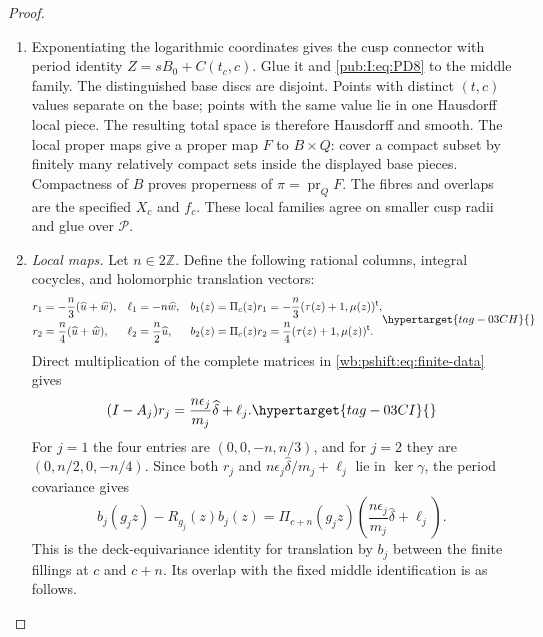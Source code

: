 \begin{proof}
\begin{enumerate}[label=\arabic*.,leftmargin=*]
\item Exponentiating the logarithmic coordinates gives the cusp
connector with period identity $Z=sB_0+C(t_c,c)$.
Glue it and \eqref{pub:I:eq:PD8} to the middle family. The distinguished base
discs are disjoint. Points with distinct $(t,c)$ values separate
on the base; points with the same value lie in one Hausdorff local
piece. The resulting total space is therefore Hausdorff and smooth.
The local proper maps give a proper map $F$ to $B\times Q$:
cover a compact subset by finitely many relatively compact sets
inside the displayed base pieces. Compactness of $B$ proves
properness of $\pi=\operatorname{pr}_QF$.
The fibres and overlaps are the specified $X_c$ and $f_c$.
These local families agree on smaller cusp radii and glue over
$\mathcal P$.
\item \emph{Local maps.}
Let $n\in2\mathbb Z$. Define the following rational columns,
integral cocycles, and holomorphic translation vectors:
\begin{equation}
\begin{aligned}
 r_1&=-\frac n3(\widehat u+\widehat w),&
 \ell_1&=-n\widehat w,&
 b_1(z)&=\Pi_c(z)r_1=-\frac n3(\tau(z)+1,\mu(z))^{\mathsf t},\\
 r_2&= \frac n4(\widehat u+\widehat w),&
 \ell_2&=\frac n2\widehat u,&
 b_2(z)&=\Pi_c(z)r_2=\frac n4(\tau(z)+1,\mu(z))^{\mathsf t}.
\end{aligned}
\hypertarget{tag-03CH}{}\label{wb:pshift:eq:local-corrections}
\end{equation}
Direct multiplication of the complete matrices in \eqref{wb:pshift:eq:finite-data} gives
\begin{equation}
 (I-A_j)r_j=\frac{n\epsilon_j}{m_j}\widehat\delta+\ell_j.
 \hypertarget{tag-03CI}{}\label{wb:pshift:eq:local-matrix-identity}
\end{equation}
For $j=1$ the four entries are $(0,0,-n,n/3)$, and for $j=2$
they are $(0,n/2,0,-n/4)$. Since both $r_j$ and
$n\epsilon_j\widehat\delta/m_j+\ell_j$ lie in $\ker\gamma$,
the period covariance gives
\[
 b_j(g_jz)-R_{g_j}(z)b_j(z)
 =\Pi_{c+n}(g_jz)
       \left(\frac{n\epsilon_j}{m_j}\widehat\delta+\ell_j\right).
\]
This is the deck-equivariance identity for translation by $b_j$
between the finite fillings at $c$ and $c+n$. Its overlap with
the fixed middle identification is as follows.


\end{enumerate}
\end{proof}
